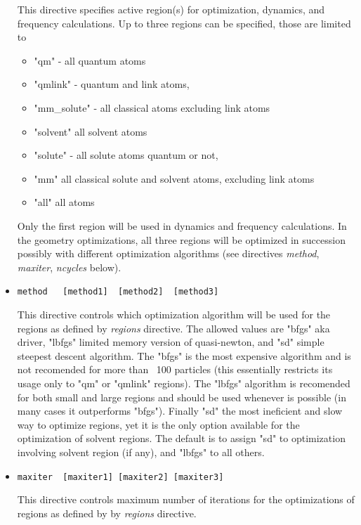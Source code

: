 \begin{itemize}
This directive specifies active region(s) for optimization, dynamics, and frequency calculations.
Up to three regions can be specified, those are limited to 
\begin{itemize}
\item
"qm" - all quantum atoms
\item
"qmlink" - quantum and link atoms,
\item
"mm{\_}solute" - all classical atoms excluding link atoms
\item
"solvent" all solvent atoms
\item
"solute" - all solute atoms quantum or not,
\item
"mm" all classical solute and solvent atoms, excluding link atoms
\item
"all" all atoms 
\end{itemize}
Only the first region will be used in dynamics and frequency calculations. In the geometry optimizations, all three regions will
be optimized in succession possibly with different optimization algorithms (see directives {\it method},  {\it maxiter},
{\it ncycles} below).

\item
\begin{verbatim}
method   [method1]  [method2]  [method3]
\end{verbatim}

This directive controls which optimization algorithm will be used for the regions as defined
by {\it regions} directive. The allowed values are "bfgs" aka driver, "lbfgs" limited memory version of quasi-newton,
and "sd" simple steepest descent algorithm. The "bfgs" is the most expensive algorithm and is not 
recomended for more than ~100 particles (this essentially restricts its usage only to "qm" or "qmlink" regions).
The "lbfgs" algorithm is recomended for both small and large regions and should be used whenever is possible (in many
cases it outperforms "bfgs"). Finally "sd" the most ineficient and slow way to optimize regions, yet it is the only option
available for the optimization of solvent regions. The default is to assign "sd" to optimization involving solvent region (if any),
and "lbfgs" to all others.



\item
\begin{verbatim}
maxiter  [maxiter1] [maxiter2] [maxiter3]
\end{verbatim}

This directive controls maximum number of iterations for the optimizations of regions as defined by
by {\it regions} directive. 




\end{itemize}
